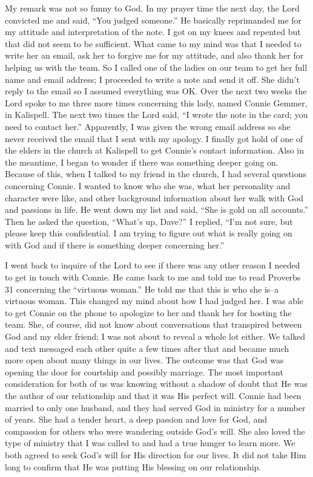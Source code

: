 \documentclass[oneside]{book}
\begin{document}
My remark was not so funny to God. In my prayer time the next day, the Lord convicted me and said, “You judged someone.” He basically reprimanded me for my attitude and interpretation of the note. I got on my knees and repented but that did not seem to be sufficient. What came to my mind was that I needed to write her an email, ask her to forgive me for my attitude, and also thank her for helping us with the team. So I called one of the ladies on our team to get her full name and email address; I proceeded to write a note and send it off. She didn’t reply to the email so I assumed everything was OK. Over the next two weeks the Lord spoke to me three more times concerning this lady, named Connie Gemmer, in Kalispell. The next two times the Lord said, “I wrote the note in the card; you need to contact her.” Apparently, I was given the wrong email address so she never received the email that I sent with my apology. I finally got hold of one of the elders in the church at Kalispell to get Connie’s contact information. Also in the meantime, I began to wonder if there was something deeper going on. Because of this, when I talked to my friend in the church, I had several questions concerning Connie. I wanted to know who she was, what her personality and character were like, and other background information about her walk with God and passions in life. He went down my list and said, “She is gold on all accounts.” Then he asked the question, “What’s up, Dave?” I replied, “I’m not sure, but please keep this confidential. I am trying to figure out what is really going on with God and if there is something deeper concerning her.” 

I went back to inquire of the Lord to see if there was any other reason I needed to get in touch with Connie. He came back to me and told me to read Proverbs 31 concerning the “virtuous woman.” He told me that this is who she is--a virtuous woman. This changed my mind about how I had judged her. I was able to get Connie on the phone to apologize to her and thank her for hosting the team. She, of course, did not know about  conversations that transpired between God and my elder friend; I was not about to reveal a whole lot either. We talked and text messaged each other quite a few times after that and became much more open about many things in our lives. The outcome was that God was opening the door for courtship and possibly marriage. The most important consideration for both of us was knowing without a shadow of doubt that He was the author of our relationship and that it was His perfect will. Connie had been married to only one husband, and they had served God in ministry for a number of years. She had a tender heart, a deep passion and love for God, and compassion for others who were wandering outside God’s will. She also loved the type of ministry that I was called to and had a true hunger to learn more. We both agreed to seek God’s will for His direction for our lives. It did not take Him long to confirm that He was putting His blessing on our relationship. 
\end{document}

